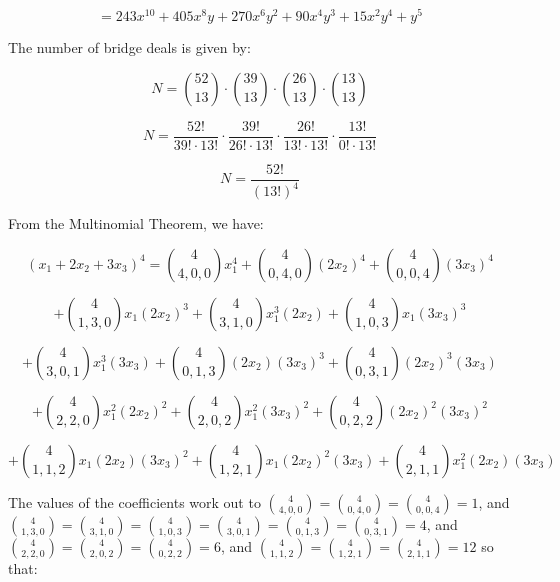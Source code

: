 \documentclass[a4paper,12pt]{article}
\begin{document}
\[ = 243x^{10} +  405 x^8 y + 270x^6 y^2 + 90x^4y^3 + 15x^2y^4 + y^5 \]

\vspace{4mm}

The number of bridge deals is given by:

\[ N = \binom{52}{13} \cdot \binom{39}{13} \cdot  \binom{26}{13} \cdot  \binom{13}{13} \]

\[ N = \frac{52!}{39! \cdot 13!} \cdot \frac{39!}{26! \cdot13!} \cdot \frac{26!}{13! \cdot13!} \cdot \frac{13!}{0! \cdot13!} \]

\[ N = \frac{52!}{(13!)^4} \]

\pagebreak
{}

From the Multinomial Theorem, we have:

\[ (x_1 + 2x_2 + 3x_3)^4 = \binom{4}{4,0,0}x_1^4 + \binom{4}{0,4,0}(2x_2)^4 + \binom{4}{0,0,4}(3x_3)^4 \]

\[ + \binom{4}{1,3,0}x_1 (2x_2)^3 + \binom{4}{3,1,0}x_1^3 (2x_2) + \binom{4}{1,0,3}x_1(3x_3)^3 \]

\[ + \binom{4}{3,0,1}x_1^3(3x_3) + \binom{4}{0,1,3}(2x_2)(3x_3)^3 + \binom{4}{0,3,1}(2x_2)^3 (3x_3) \]

\[ +\binom{4}{2,2,0}x_1^2(2x_2)^2 + \binom{4}{2,0,2}x_1^2(3x_3)^2 + \binom{4}{0,2,2}(2x_2)^2(3x_3)^2 \]

\[ + \binom{4}{1,1,2}x_1 (2x_2) (3x_3)^2+ \binom{4}{1,2,1}x_1(2x_2)^2(3x_3) + \binom{4}{2,1,1}x_1^2(2x_2)(3x_3) \]

\vspace{2mm}
The values of the coefficients work out to $\binom{4}{4,0,0} = \binom{4}{0,4,0} = \binom{4}{0,0,4} = 1$, and $\binom{4}{1,3,0} = \binom{4}{3,1,0} = \binom{4}{1,0,3} = \binom{4}{3,0,1} = \binom{4}{0,1,3} =  \binom{4}{0,3,1} = 4$, and $\binom{4}{2,2,0} = \binom{4}{2,0,2} = \binom{4}{0,2,2} = 6$, and $\binom{4}{1,1,2} = \binom{4}{1,2,1} = \binom{4}{2,1,1} = 12$ so that:
\end{document}

